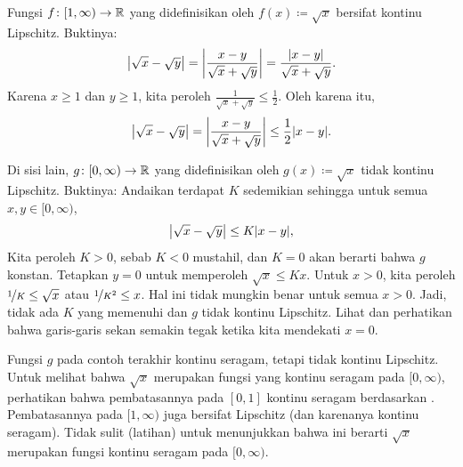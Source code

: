 \begin{example}
Fungsi $f \colon [1,\infty) \to {\mathbb{R}}$ yang didefinisikan oleh $f(x) \coloneqq \sqrt{x}$
bersifat kontinu Lipschitz. Buktinya:
\begin{equation*}
\left\lvert {\sqrt{x}-\sqrt{y}} \right\rvert = 
\left\lvert {\frac{x-y}{\sqrt{x}+\sqrt{y}}} \right\rvert
=
\frac{\lvert {x-y} \rvert}{\sqrt{x}+\sqrt{y}} .
\end{equation*}
Karena $x \geq 1$ dan $y \geq 1$, kita peroleh $\frac{1}{\sqrt{x}+\sqrt{y}}
\leq \frac{1}{2}$.  Oleh karena itu,
\begin{equation*}
\left\lvert {\sqrt{x}-\sqrt{y}} \right\rvert = 
\left\lvert {\frac{x-y}{\sqrt{x}+\sqrt{y}}} \right\rvert
\leq
\frac{1}{2}
\lvert {x-y} \rvert.
\end{equation*}

Di sisi lain, $g \colon [0,\infty) \to {\mathbb{R}}$ yang didefinisikan oleh
$g(x) \coloneqq \sqrt{x}$ tidak kontinu Lipschitz.  Buktinya:
Andaikan terdapat $K$ sedemikian sehingga untuk semua $x,y \in [0,\infty)$,
\begin{equation*}
\left\lvert {\sqrt{x}-\sqrt{y}} \right\rvert 
\leq
K \lvert {x-y} \rvert ,
\end{equation*}
Kita peroleh $K > 0$, sebab $K < 0$ mustahil,
dan $K=0$ akan berarti bahwa $g$ konstan.
Tetapkan $y=0$ untuk memperoleh
$\sqrt{x} \leq K x$.
Untuk $x > 0$, kita peroleh
$\nicefrac{1}{K} \leq \sqrt{x}$ atau $\nicefrac{1}{K^2} \leq x$.
Hal ini tidak mungkin benar untuk semua
$x > 0$.  Jadi, tidak ada $K$ yang memenuhi dan $g$ tidak
kontinu Lipschitz.  Lihat  dan perhatikan bahwa garis-garis
sekan semakin tegak ketika kita mendekati $x=0$.
\begin{myfigureht}
\caption{Grafik $\sqrt{x}$ dan beberapa garis sekan yang melalui $(0,0)$ dan
$(x,\sqrt{x})$.\label{fig:sqrtgraph}}
\end{myfigureht}

Fungsi $g$ pada contoh terakhir kontinu seragam,
tetapi tidak kontinu Lipschitz.
Untuk melihat bahwa $\sqrt{x}$ merupakan fungsi yang
kontinu seragam pada $[0,\infty)$,
perhatikan bahwa pembatasannya pada $[0,1]$ kontinu seragam berdasarkan .
Pembatasannya pada $[1,\infty)$ juga bersifat Lipschitz (dan karenanya kontinu seragam).
Tidak sulit (latihan) untuk menunjukkan bahwa ini berarti $\sqrt{x}$ merupakan
fungsi kontinu seragam pada $[0,\infty)$.
\end{example}

